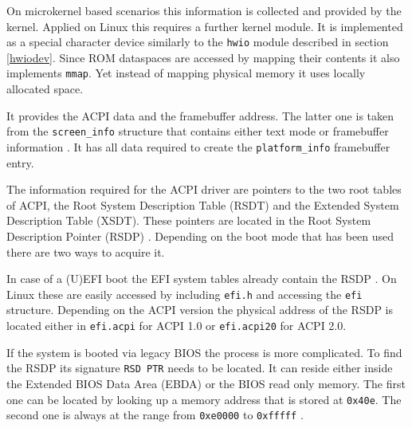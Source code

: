 \documentclass[
a4paper,
11pt,
twoside
]{report}
\begin{document}
		On microkernel based scenarios this information is collected and provided by the kernel.
		Applied on Linux this requires a further kernel module.
		It is implemented as a special character device similarly to the \texttt{hwio} module described in section \ref{hwiodev}.
		Since ROM dataspaces are accessed by mapping their contents it also implements \texttt{mmap}.
		Yet instead of mapping physical memory it uses locally allocated space.
		
		It provides the ACPI data and the framebuffer address.
		The latter one is taken from the \texttt{screen\_info} structure that contains either text mode or framebuffer information \citep{zeropage}.
		It has all data required to create the \texttt{platform\_info} framebuffer entry.
		
		The information required for the ACPI driver are pointers to the two root tables of ACPI, the Root System Description Table (RSDT) and the Extended System Description Table (XSDT).
		These pointers are located in the Root System Description Pointer (RSDP) \citep{acpi_spec}.
		Depending on the boot mode that has been used there are two ways to acquire it.
		
		In case of a (U)EFI boot the EFI system tables already contain the RSDP \citep{acpi_spec}.
		On Linux these are easily accessed by including \texttt{efi.h} and accessing the \texttt{efi} structure.
		Depending on the ACPI version the physical address of the RSDP is located either in \texttt{efi.acpi} for ACPI 1.0 or \texttt{efi.acpi20} for ACPI 2.0.
		
		If the system is booted via legacy BIOS the process is more complicated.
		To find the RSDP its signature \texttt{RSD PTR} needs to be located.
		It can reside either inside the Extended BIOS Data Area (EBDA) or the BIOS read only memory.
		The first one can be located by looking up a memory address that is stored at \texttt{0x40e}.
		The second one is always at the range from \texttt{0xe0000} to \texttt{0xfffff} \citep{acpi_spec}.
		
\end{document}
